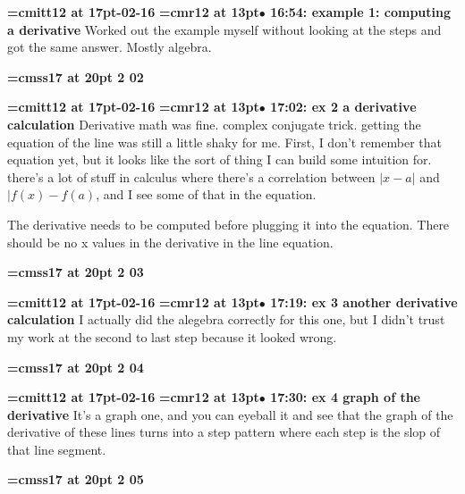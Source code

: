 {\medskip\noindent\bf\font\titlefont=cmitt12 at 17pt-02-16}\medskip
{\smallskip\noindent\bf\font\titlefont=cmr12 at 13pt\titlefont $\bullet$ 16:54: example 1: computing a derivative}\smallskip
Worked out the example myself without looking at the steps and got the same answer. Mostly algebra.
\par

{\medskip\noindent\bf\font\titlefont=cmss17 at 20pt 2 02}\medskip

{\medskip\noindent\bf\font\titlefont=cmitt12 at 17pt-02-16}\medskip
{\smallskip\noindent\bf\font\titlefont=cmr12 at 13pt\titlefont $\bullet$ 17:02: ex 2 a derivative calculation}\smallskip
Derivative math was fine. complex conjugate trick. getting the equation of the line was still a little shaky for me. First, I don't remember that equation yet, but it looks like the sort of thing I can build some intuition for. there's a lot of stuff in calculus where there's a correlation between $|x - a|$ and $|f(x) - f(a)$, and I see some of that in the equation.
\par

The derivative needs to be computed before plugging it into the equation. There should be no x values in the derivative in the line equation.
\par

{\medskip\noindent\bf\font\titlefont=cmss17 at 20pt 2 03}\medskip

{\medskip\noindent\bf\font\titlefont=cmitt12 at 17pt-02-16}\medskip
{\smallskip\noindent\bf\font\titlefont=cmr12 at 13pt\titlefont $\bullet$ 17:19: ex 3 another derivative calculation}\smallskip
I actually did the alegebra correctly for this one, but I didn't trust my work at the second to last step because it looked wrong.
\par

{\medskip\noindent\bf\font\titlefont=cmss17 at 20pt 2 04}\medskip

{\medskip\noindent\bf\font\titlefont=cmitt12 at 17pt-02-16}\medskip
{\smallskip\noindent\bf\font\titlefont=cmr12 at 13pt\titlefont $\bullet$ 17:30: ex 4 graph of the derivative}\smallskip
It's a graph one, and you can eyeball it and see that the graph of the derivative of these lines turns into a step pattern where each step is the slop of that line segment.
\par

{\medskip\noindent\bf\font\titlefont=cmss17 at 20pt 2 05}\medskip

